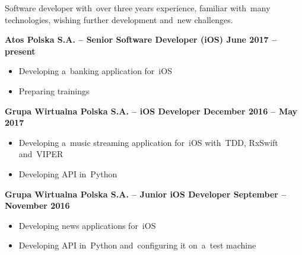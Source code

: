\documentclass[11pt,a4paper]{article}
\newcommand*\header[1]{
    \noindent\raisebox{.1cm}{\color{MidnightBlue}\rule{1.5cm}{.1cm}\hspace{.2cm}\raisebox{-.1cm}{\large\bf #1}}}
\begin{document}

    \bigskip

    \noindent
    Software developer with~over three years experience, familiar with~many technologies, wishing further development
    and~new challenges.


    \bigskip

    \header{Experience}

    \smallskip

    {\bf Atos Polska S.A. -- Senior Software Developer (iOS) \hfill June 2017 -- present}

    \vspace{-.23cm}
    \begin{itemize}[leftmargin=1.5cm] \itemsep.2mm \parskip0mm 
        \item Developing a~banking application for~iOS
        \item Preparing trainings
    \end{itemize}

    \vspace{-.17cm}

    {\bf Grupa Wirtualna Polska S.A. -- iOS Developer \hfill December 2016 -- May 2017}

    \vspace{-.23cm}
    \begin{itemize}[leftmargin=1.5cm] \itemsep.2mm \parskip0mm 
        \item Developing a~music streaming application for~iOS with~TDD, RxSwift and~VIPER
        \item Developing API in~Python
    \end{itemize}

    \vspace{-.17cm}

    {\bf Grupa Wirtualna Polska S.A. -- Junior iOS Developer \hfill September -- November 2016}

    \vspace{-.23cm}
    \begin{itemize}[leftmargin=1.5cm] \itemsep.2mm \parskip0mm 
        \item Developing news applications for~iOS
        \item Developing API in~Python and~configuring it on~a~test machine
    \end{itemize}
\end{document}
